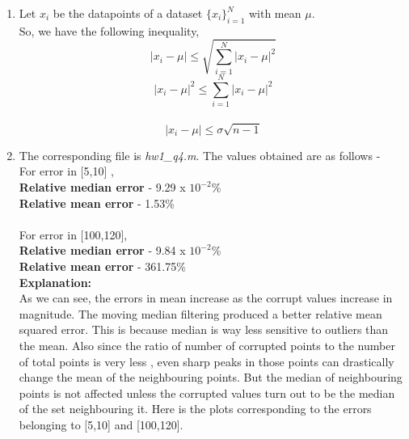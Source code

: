 \documentclass[11pt]{article}
\begin{document}
\begin{enumerate}
	\item {
	Let $x_i$ be the datapoints of a dataset $\{x_i\}_{i=1}^{N}$ with mean $\mu$. \\
	So, we have the following inequality,
	$$	\left|x_i - \mu\right| \leq \sqrt{\sum_{i=1}^{N}{\left|x_i -\mu\right|}^2} $$
	$$	\left|x_i -\mu\right|^2 \leq \sum_{i=1}^{N}{\left|x_i -\mu\right|}^2 $$ \\
	$$	\left|x_i - \mu\right| \leq \sigma\sqrt{n-1} $$ 
		\hfill {}
	}

	\item {
		The corresponding file is \textit{hw1\_q4.m}. The values obtained are as follows - \\
		For error in [5,10] , \\
		\textbf{Relative median error} - 9.29 x $10^{-2}$\% \\
		\textbf{Relative mean error} - 1.53\% \\ \\
		For error in [100,120], \\
		\textbf{Relative median error} - 9.84 x $10^{-2}$\% \\
		\textbf{Relative mean error} - 361.75\% \\

		\textbf{Explanation: } \\
		As we can see, the errors in mean increase as the corrupt values increase in magnitude. The moving median filtering produced a better relative mean squared error. This is because median is way less sensitive to outliers than the mean. 
		Also since the ratio of number of corrupted points to the number of total points is very less , even sharp peaks in those points can drastically change the mean of the neighbouring points. But the median of neighbouring points is not affected unless the corrupted values turn out to be the median of the set neighbouring it. 
		Here is the plots corresponding to the errors belonging to [5,10] and [100,120].
		
}
\end{enumerate}
\end{document}
